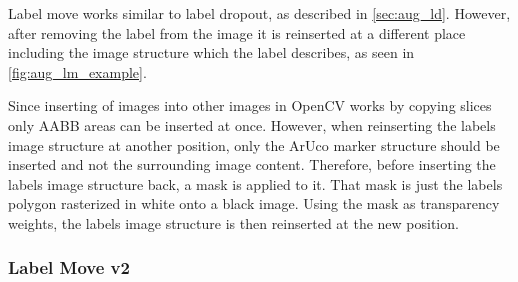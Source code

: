 \documentclass[10pt]{book}
\newcommand{\figureref}[1]{\autoref{#1}}
\begin{document}
Label move works similar to label dropout, as described in \autoref{sec:aug_ld}. However, after removing the label from the image it is reinserted at a different place including the image structure which the label describes, as seen in \figureref{fig:aug_lm_example}. 

Since inserting of images into other images in OpenCV works by copying slices only \ac{AABB} areas can be inserted at once. However, when reinserting the labels image structure at another position, only the \ac{ArUco} marker structure should be inserted and not the surrounding image content. Therefore, before inserting the labels image structure back, a mask is applied to it. That mask is just the labels polygon rasterized in white onto a black image. Using the mask as transparency weights, the labels image structure is then reinserted at the new position.

\subsubsection{Label Move v2}
\end{document}
